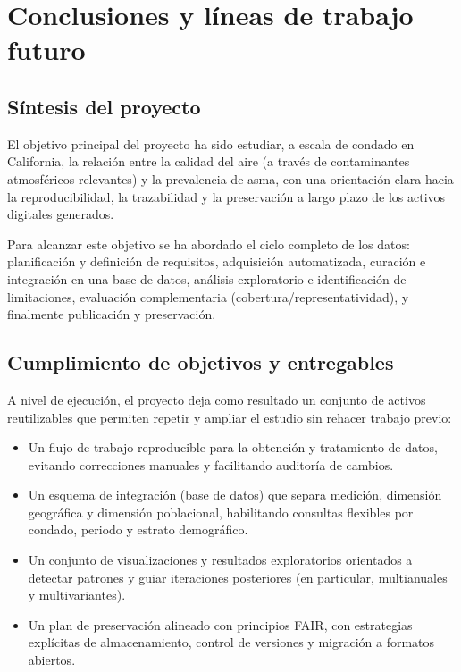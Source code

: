 \chapter{Conclusiones y líneas de trabajo futuro}
\label{ch:conclusiones}

\section{Síntesis del proyecto}
El objetivo principal del proyecto ha sido estudiar, a escala de condado en California, la relación entre
la calidad del aire (a través de contaminantes atmosféricos relevantes) y la prevalencia de asma, con una
orientación clara hacia la reproducibilidad, la trazabilidad y la preservación a largo plazo de los activos
digitales generados.

Para alcanzar este objetivo se ha abordado el ciclo completo de los datos: planificación y definición de
requisitos, adquisición automatizada, curación e integración en una base de datos, análisis exploratorio e
identificación de limitaciones, evaluación complementaria (cobertura/representatividad), y finalmente
publicación y preservación.

\section{Cumplimiento de objetivos y entregables}
A nivel de ejecución, el proyecto deja como resultado un conjunto de activos reutilizables que permiten
repetir y ampliar el estudio sin rehacer trabajo previo:
\begin{itemize}
  \item Un flujo de trabajo reproducible para la obtención y tratamiento de datos, evitando correcciones manuales
  y facilitando auditoría de cambios.
  \item Un esquema de integración (base de datos) que separa medición, dimensión geográfica y dimensión poblacional,
  habilitando consultas flexibles por condado, periodo y estrato demográfico.
  \item Un conjunto de visualizaciones y resultados exploratorios orientados a detectar patrones y guiar iteraciones
  posteriores (en particular, multianuales y multivariantes).
  \item Un plan de preservación alineado con principios FAIR, con estrategias explícitas de almacenamiento, control
  de versiones y migración a formatos abiertos.
\end{itemize}


